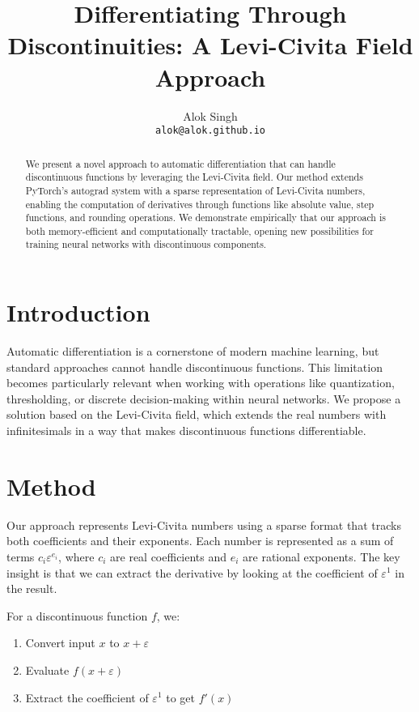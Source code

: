 \documentclass{article}
\title{Differentiating Through Discontinuities: A Levi-Civita Field Approach}
\author{
    Alok Singh\\
    \texttt{alok@alok.github.io}
}
\begin{document}
\maketitle

\begin{abstract}
We present a novel approach to automatic differentiation that can handle discontinuous functions by leveraging the Levi-Civita field. Our method extends PyTorch's autograd system with a sparse representation of Levi-Civita numbers, enabling the computation of derivatives through functions like absolute value, step functions, and rounding operations. We demonstrate empirically that our approach is both memory-efficient and computationally tractable, opening new possibilities for training neural networks with discontinuous components.
\end{abstract}

\section{Introduction}
Automatic differentiation is a cornerstone of modern machine learning, but standard approaches cannot handle discontinuous functions. This limitation becomes particularly relevant when working with operations like quantization, thresholding, or discrete decision-making within neural networks. We propose a solution based on the Levi-Civita field, which extends the real numbers with infinitesimals in a way that makes discontinuous functions differentiable.

\section{Method}
Our approach represents Levi-Civita numbers using a sparse format that tracks both coefficients and their exponents. Each number is represented as a sum of terms \(c_i \varepsilon^{e_i}\), where \(c_i\) are real coefficients and \(e_i\) are rational exponents. The key insight is that we can extract the derivative by looking at the coefficient of \(\varepsilon^1\) in the result.

For a discontinuous function \(f\), we:
\begin{enumerate}
    \item Convert input \(x\) to \(x + \varepsilon\)
    \item Evaluate \(f(x + \varepsilon)\)
    \item Extract the coefficient of \(\varepsilon^1\) to get \(f'(x)\)
\end{enumerate}
\end{document}
